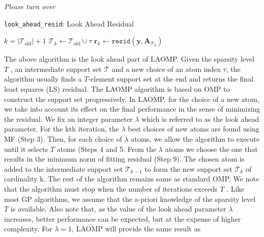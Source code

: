 \documentclass[12pt]{article}
\begin{document}
	\vspace{2cm}
	\begin{center}
		\textit{Please turn over}
	\end{center}
	\begin{algorithm}[ht]
		\caption{\texttt{look\_ahead\_resid}: Look Ahead Residual}
		\KwInit{}
		$k = |\mathcal{T}_{\text{old}}| + 1$\;
		$\mathcal{T}_k \gets \mathcal{T}_{\text{old}} \cup \tau$\;
		$\mathbf{r}_k \gets \texttt{resid}(\mathbf{y}, \mathbf{A}_{\mathcal{T}_k})$\;
		\KwIter{}
\end{algorithm}
\newpage
The above algorithm is the look ahead part of LAOMP. Given the sparsity
level $T$ , an intermediate support set $\mathcal{T}$ and a new choice of an atom index $\tau$, the
algorithm usually finds a $T$-element support set at the end and returns the final least squares (LS) residual.	
\newline
The LAOMP algorithm is based on OMP to construct the support set progressively. In LAOMP, for the choice of a new atom, we take into account its effect
on the final performance in the sense of minimizing the residual. We fix an integer
parameter $\lambda$ which is referred to as the look ahead parameter. For the kth iteration,
the $\lambda$ best choices of new atoms are found using MF (Step 3). Then, for each choice
of $\lambda$ atoms, we allow the algorithm to execute until it selects $T$ atoms (Steps 4 and
5. From the $\lambda$ atoms we choose the one that results in the minimum norm of fitting
residual (Step 9). The chosen atom is added to the intermediate support set $\mathcal{T}_{k-1}$
to form the new support set $\mathcal{T}_k$ of cardinality k. The rest of the algorithm remains
same as standard OMP. We note that the algorithm must stop when the number
of iterations exceeds $T$ . Like most GP algorithms, we assume that the a-priori knowledge of the sparsity level $T$ is available. Also note that, as the value of the
look ahead parameter $\lambda$ increases, better performance can be expected, but at the
expense of higher complexity. For $\lambda = 1$, LAOMP will provide the same result as
\end{document}
